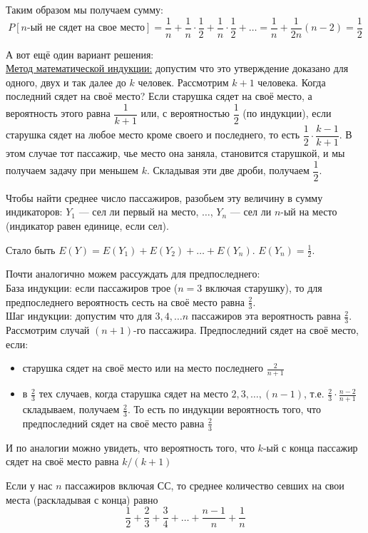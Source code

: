 \documentclass[12pt, a4paper]{article}\usepackage[]{graphicx}\usepackage[]{color}
\begin{document}
\begin{enumerate}
\begin{enumerate}
Таким образом мы получаем сумму:
\[
P[n\text{-ый не сядет на свое место}] = \dfrac{1}{n} + \dfrac{1}{n}\cdot \dfrac{1}{2} + \dfrac{1}{n}\cdot \dfrac{1}{2} + \dots = \dfrac{1}{n}  + \frac{1}{2n}(n-2) = \dfrac{1}{2}
\]
\begin{center}
\end{center}

А вот ещё один вариант решения: \\
\underline{Метод математической индукции:} допустим что это утверждение доказано для одного, двух и так далее до $k$ человек. Рассмотрим $k+1$ человека. Когда последний сядет на своё место? Если старушка сядет на своё место, а вероятность этого равна $\dfrac{1}{k+1}$ или, с вероятностью $\dfrac{1}{2}$ (по индукции), если старушка сядет на любое место кроме своего и последнего, то есть $\dfrac{1}{2}\cdot\dfrac{k-1}{k+1}$. В этом случае тот\vspace{0.2cm} пассажир, чье место  она заняла, становится старушкой, и мы получаем задачу при меньшем $k$. Складывая эти две дроби, получаем $\dfrac{1}{2} $.

Чтобы найти среднее число пассажиров, разобьем эту величину в сумму индикаторов: $Y_1$ — сел ли первый на место, $\dots$, $Y_n$ — сел ли $n$-ый на место (индикатор равен единице, если сел).

Стало быть $E(Y)=E(Y_1)+E(Y_2)+\ldots+E(Y_n)$. $E(Y_n)=\frac{1}{2}$.

Почти аналогично можем рассуждать для предпоследнего:\\
База индукции: если пассажиров трое ($n=3$ включая старушку), то для предпоследнего вероятность сесть на своё место равна $\frac{2}{3}$.\\
Шаг индукции: допустим что для $3, 4, \ldots n$ пассажиров эта вероятность равна $\frac{2}{3}$.
Рассмотрим случай $(n+1)$-го пассажира.
Предпоследний сядет на своё место, если:

\renewcommand{\labelitemi}{\textbullet}

\begin{itemize}
\item старушка сядет на своё место или на место последнего $\frac{2}{n+1}$
\item в $\frac{2}{3}$ тех случаев, когда старушка сядет на место $2, 3, \ldots, (n-1)$, т.е. $\frac{2}{3}\cdot \frac{n-2}{n+1}$
складываем, получаем $\frac{2}{3}$.
То есть по индукции вероятность того, что предпоследний сядет на своё место равна $\frac{2}{3}$
\end{itemize}
И по аналогии можно увидеть, что вероятность того, что $k$-ый с конца пассажир сядет на своё место равна $k/(k+1)$

Если у нас $n$ пассажиров включая СС, то среднее количество севших на свои места (раскладывая с конца) равно \[\frac{1}{2}+\frac{2}{3}+\frac{3}{4}+\dots+\frac{n-1}{n}+\frac{1}{n}\]

\end{enumerate}

\end{enumerate}
\end{document}
